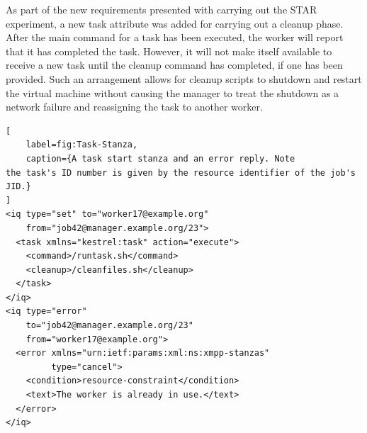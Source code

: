 As part of the new requirements presented with carrying out the STAR
experiment, a new task attribute was added for carrying out a cleanup
phase. After the main command for a task has been executed, the worker
will report that it has completed the task. However, it will not make
itself available to receive a new task until the cleanup command has
completed, if one has been provided. Such an arrangement allows for
cleanup scripts to shutdown and restart the virtual machine without
causing the manager to treat the shutdown as a network failure and
reassigning the task to another worker.

\begin{lstlisting}[
    label=fig:Task-Stanza,
    caption={A task start stanza and an error reply. Note
the task's ID number is given by the resource identifier of the job's
JID.}
]
<iq type="set" to="worker17@example.org" 
    from="job42@manager.example.org/23">
  <task xmlns="kestrel:task" action="execute"> 
    <command>/runtask.sh</command> 
    <cleanup>/cleanfiles.sh</cleanup>
  </task> 
</iq>
<iq type="error" 
    to="job42@manager.example.org/23" 
    from="worker17@example.org">
  <error xmlns="urn:ietf:params:xml:ns:xmpp-stanzas" 
         type="cancel"> 
    <condition>resource-constraint</condition> 
    <text>The worker is already in use.</text> 
  </error> 
</iq>
\end{lstlisting}

